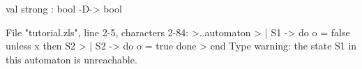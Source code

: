 \chklistingtrue
{}
\begin{ChkListingMsg}
val strong : bool -D-> bool
\end{ChkListingMsg}
\begin{ChkListingErr}
File "tutorial.zls", line 2-5, characters 2-84:
>..automaton
>  | S1 -> do o = false unless x then S2
>  | S2 -> do o = true done
>  end
Type warning: the state S1 in this automaton is unreachable.
\end{ChkListingErr}
